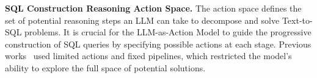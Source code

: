 \textbf{SQL Construction Reasoning Action Space.}
The action space defines the set of potential reasoning steps an LLM can take to decompose and solve Text-to-SQL problems. It is crucial for the LLM-as-Action Model to guide the progressive construction of SQL queries by specifying possible actions at each stage.
% 
% 
Previous works~\cite{CHASE, chesssql, XiYan} used limited actions and fixed pipelines, which restricted the model's ability to explore the full space of potential solutions. 

